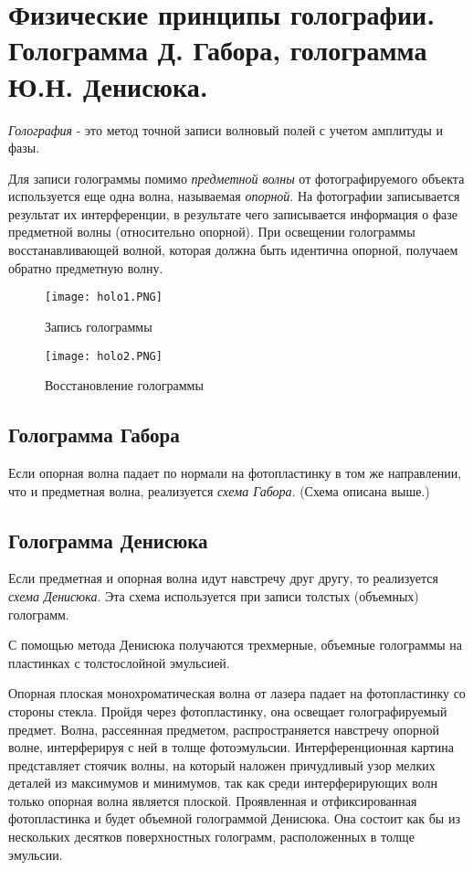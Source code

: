 
\section{Физические принципы голографии. Голограмма Д. Габора, голограмма Ю.Н. Денисюка.}


\textit{Голография} - это метод точной записи волновый полей с учетом амплитуды и фазы.

\medskip 

Для записи голограммы помимо \textit{предметной волны} от фотографируемого объекта используется еще одна волна, называемая \textit{опорной}. На фотографии записывается результат их интерференции, в результате чего записывается информация о фазе предметной волны (относительно опорной). При освещении голограммы восстанавливающей волной, которая должна быть идентична опорной, получаем обратно предметную волну.



\begin{figure}[h!]
    \centering
    \texttt{[image: holo1.PNG]}
    \caption{Запись голограммы}
    \label{fig:my_label}
\end{figure} 



\begin{figure}[h!]
    \centering
    \texttt{[image: holo2.PNG]}
    \caption{Восстановление голограммы}
    \label{fig:my_label}
\end{figure} 
\newpage


\subsection{Голограмма Габора}

Если опорная волна падает по нормали на фотопластинку в том же направлении, что и предметная волна, реализуется \textit{схема Габора}. (Схема описана выше.)
\subsection{Голограмма Денисюка}

Если предметная и опорная волна идут навстречу друг другу, то реализуется \textit{схема Денисюка}. Эта схема используется при записи толстых (объемных) голограмм.

С помощью метода Денисюка получаются трехмерные, объемные голограммы на пластинках с толстослойной эмульсией.

Опорная плоская монохроматическая волна от лазера падает на фотопластинку со стороны стекла. Пройдя через фотопластинку, она освещает голографируемый предмет. Волна, рассеянная предметом, распространяется навстречу опорной волне, интерферируя с ней в толще фотоэмульсии. Интерференционная картина представляет стоячик волны, на который наложен причудливый узор мелких деталей из максимумов и минимумов, так как среди интерферирующих волн только опорная волна является плоской. Проявленная и отфиксированная фотопластинка и будет объемной голограммой Денисюка. Она состоит как бы из нескольких десятков поверхностных голограмм, расположенных в толще эмульсии.

